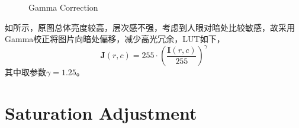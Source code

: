 \documentclass[12pt,a4paper]{article}
\begin{document}
\begin{figure}[H]
    \centering
    \caption{Gamma Correction}
    \label{fig:gamma}
\end{figure}

如所示，原图总体亮度较高，层次感不强，考虑到人眼对暗处比较敏感，故采用Gamma校正将图片向暗处偏移，减少高光冗余，LUT如下，
\begin{equation}
    \boldsymbol{J}(r, c) = 255 \cdot \left(\frac{\boldsymbol{I}(r, c)}{255}\right)^\gamma
\end{equation}
其中取参数$\gamma=1.25$。


\section{Saturation Adjustment}
\end{document}
